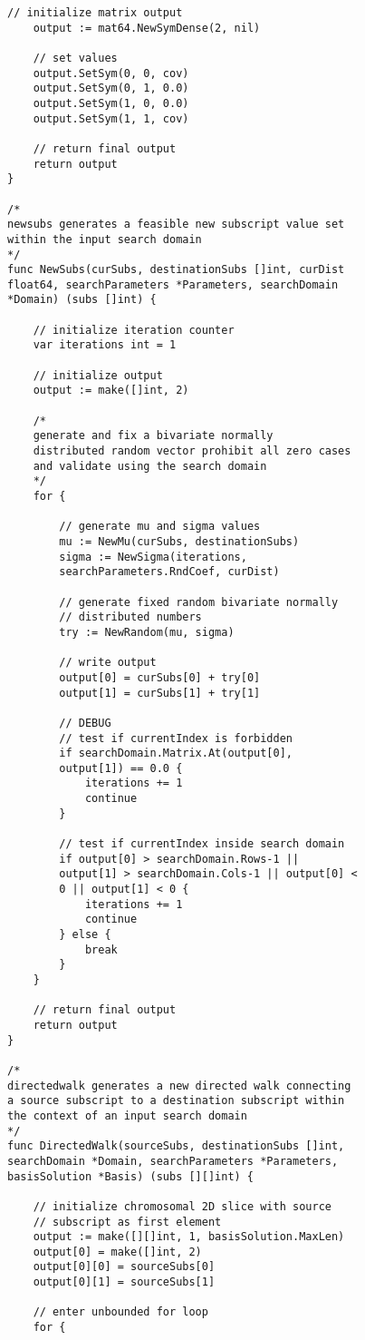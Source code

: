\begin{lstlisting}[basicstyle=\small]
	// initialize matrix output
	output := mat64.NewSymDense(2, nil)

	// set values
	output.SetSym(0, 0, cov)
	output.SetSym(0, 1, 0.0)
	output.SetSym(1, 0, 0.0)
	output.SetSym(1, 1, cov)

	// return final output
	return output
}

/* 
newsubs generates a feasible new subscript value set 
within the input search domain
*/
func NewSubs(curSubs, destinationSubs []int, curDist 
float64, searchParameters *Parameters, searchDomain 
*Domain) (subs []int) {

	// initialize iteration counter
	var iterations int = 1

	// initialize output
	output := make([]int, 2)

	/* 
	generate and fix a bivariate normally 
	distributed random vector prohibit all zero cases 
	and validate using the search domain
	*/
	for {

		// generate mu and sigma values
		mu := NewMu(curSubs, destinationSubs)
		sigma := NewSigma(iterations, 
		searchParameters.RndCoef, curDist)

		// generate fixed random bivariate normally 
		// distributed numbers
		try := NewRandom(mu, sigma)

		// write output
		output[0] = curSubs[0] + try[0]
		output[1] = curSubs[1] + try[1]

		// DEBUG
		// test if currentIndex is forbidden
		if searchDomain.Matrix.At(output[0], 
		output[1]) == 0.0 {
			iterations += 1
			continue
		}

		// test if currentIndex inside search domain
		if output[0] > searchDomain.Rows-1 || 
		output[1] > searchDomain.Cols-1 || output[0] < 
		0 || output[1] < 0 {
			iterations += 1
			continue
		} else {
			break
		}
	}

	// return final output
	return output
}

/* 
directedwalk generates a new directed walk connecting 
a source subscript to a destination subscript within 
the context of an input search domain
*/
func DirectedWalk(sourceSubs, destinationSubs []int, 
searchDomain *Domain, searchParameters *Parameters, 
basisSolution *Basis) (subs [][]int) {

	// initialize chromosomal 2D slice with source 
	// subscript as first element
	output := make([][]int, 1, basisSolution.MaxLen)
	output[0] = make([]int, 2)
	output[0][0] = sourceSubs[0]
	output[0][1] = sourceSubs[1]

	// enter unbounded for loop
	for {


\end{lstlisting}
